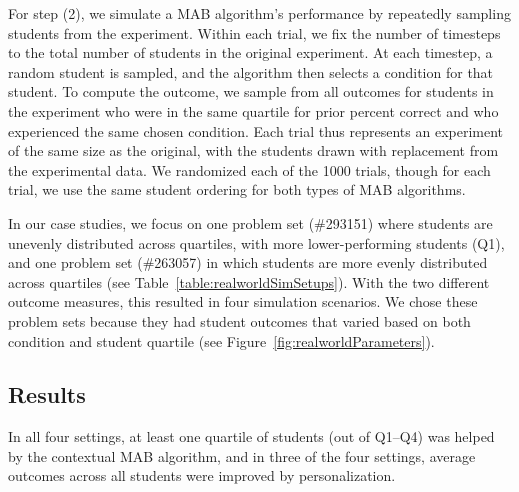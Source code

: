 For step (2), we simulate a MAB algorithm's performance by repeatedly sampling students from the experiment. Within each trial, we fix the number of timesteps to the total number of students in the original experiment. At each timestep, a random student is sampled, and the algorithm then selects a condition for that student.
To compute the outcome, we sample from all outcomes for students in the experiment who were in the same quartile for prior percent correct and who experienced the same chosen condition. Each trial thus represents an experiment of the same size as the original, with the students drawn with replacement from the experimental data. We randomized each of the 1000 trials, though for each trial, we use the same student ordering for both types of MAB algorithms.

In our case studies, we focus on one problem set (\#293151) where students are unevenly distributed across quartiles, with more lower-performing students (Q1), and one problem set (\#263057) in which students are more evenly distributed across quartiles (see Table~\ref{table:realworldSimSetups}).  
With the two different outcome measures, this resulted in four simulation scenarios.
We chose these problem sets because they had student outcomes that varied based on both condition and student quartile (see Figure~\ref{fig:realworldParameters}).


\subsection{Results}

In all four settings, at least one quartile of students (out of Q1--Q4) was helped by the contextual MAB algorithm, and in three of the four settings, average outcomes across all students were improved by personalization. 


